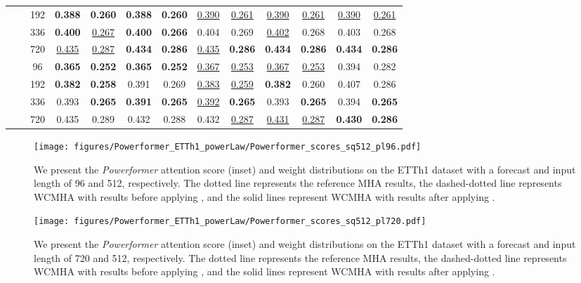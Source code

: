 \begin{table*}[!ht]
{\begin{tabular}{c|c|c|cc|cc|cc|cc|cc}
    		 & & 192 &  \textbf{0.388} & \textbf{0.260} &  \textbf{0.388} & \textbf{0.260} &  \underline{0.390} & \underline{0.261} &  \underline{0.390} & \underline{0.261} &  \underline{0.390} & \underline{0.261} \\
    		 & & 336 &  \textbf{0.400} & \underline{0.267} &  \textbf{0.400} & \textbf{0.266} &  0.404 & 0.269 &  \underline{0.402} & 0.268 &  0.403 & 0.268 \\
    		 & & 720 &  \underline{0.435} & \underline{0.287} &  \textbf{0.434} & \textbf{0.286} &  \underline{0.435} & \textbf{0.286} &  \textbf{0.434} & \textbf{0.286} &  \textbf{0.434} & \textbf{0.286} \\ \cmidrule{2-13}
    	& \multirow{4}{*}{\rotatebox[origin=c]{90}{\text{512}}}
    		 & 96 &  \textbf{0.365} & \textbf{0.252} &  \textbf{0.365} & \textbf{0.252} &  \underline{0.367} & \underline{0.253} &  \underline{0.367} & \underline{0.253} &  0.394 & 0.282 \\
    		 & & 192 &  \textbf{0.382} & \textbf{0.258} &  0.391 & 0.269 &  \underline{0.383} & \underline{0.259} &  \textbf{0.382} & 0.260 &  0.407 & 0.286 \\
    		 & & 336 &  0.393 & \textbf{0.265} &  \textbf{0.391} & \textbf{0.265} &  \underline{0.392} & \textbf{0.265} &  0.393 & \textbf{0.265} &  0.394 & \textbf{0.265} \\
    		 & & 720 &  0.435 & 0.289 &  0.432 & 0.288 &  0.432 & \underline{0.287} &  \underline{0.431} & \underline{0.287} &  \textbf{0.430} & \textbf{0.286} \\
    	\bottomrule
    \end{tabular}}
\end{table*}
\endgroup



\begin{figure*}[!ht]
    \centering
    \texttt{[image: figures/Powerformer\_ETTh1\_powerLaw/Powerformer\_scores\_sq512\_pl96.pdf]}
    \caption{We present the \emph{Powerformer} attention score (inset) and weight distributions on the ETTh1 dataset with a forecast and input length of 96 and 512, respectively. The dotted line represents the reference MHA results, the dashed-dotted line represents WCMHA with \fpl{} results before applying \maskCL, and the solid lines represent WCMHA with \fpl{} results after applying \maskCL.}
    \label{fig:powerformer_etth1_96_powerLaw_attn_full}
\end{figure*}

\begin{figure*}[!ht]
    \centering
    \texttt{[image: figures/Powerformer\_ETTh1\_powerLaw/Powerformer\_scores\_sq512\_pl720.pdf]}
    \caption{We present the \emph{Powerformer} attention score (inset) and weight distributions on the ETTh1 dataset with a forecast and input length of 720 and 512, respectively. The dotted line represents the reference MHA results, the dashed-dotted line represents WCMHA with \fpl{} results before applying \maskCL, and the solid lines represent WCMHA with \fpl{} results after applying \maskCL.}
    \label{fig:powerformer_etth1_720_powerLaw_attn_full}
\end{figure*}

